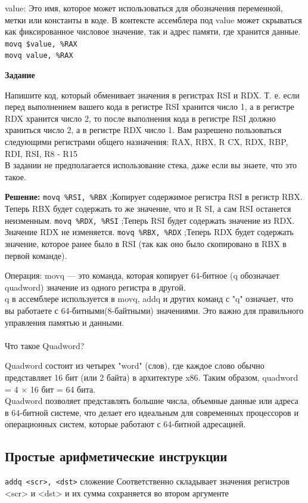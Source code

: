	\par value: Это имя, которое может использоваться для обозначения переменной, метки или константы в коде. В контексте ассемблера под value может скрываться как фиксированное числовое значение, так и адрес памяти, где хранится данные.
	\\
	\texttt{movq \$value, \%RAX}
 	\\
 	\texttt{movq value, \%RAX}

	
    \textbf{Задание}
	\par Напишите код, который обменивает значения в регистрах RSI и RDX. Т. е. если перед выполнением вашего кода в регистре RSI хранится число 1, а в регистре RDX хранится число 2, то после выполнения кода в регистре RSI должно храниться число 2, а в регистре RDX число 1. Вам разрешено пользоваться следующими регистрами общего назначения: RAX, RBX, R
	CX, RDX, RBP, RDI, RSI, R8 - R15
	\\В задании не предполагается использование стека, даже если вы знаете, что это такое.
	
	\textbf{Решение:}
	\texttt {movq \%RSI, \%RBX} ;Копирует содержимое регистра RSI в регистр RBX. Теперь RBX будет содержать то же значение, что и R
	SI, а сам RSI останется неизменным.
    \texttt{movq \%RDX, \%RSI} ;Теперь RSI будет содержать значение из RDX. Значение RDX не изменяется.
	\texttt{movq \%RBX, \%RDX} ;Теперь RDX будет содержать значение, которое ранее было в RSI (так как оно было скопировано в RBX
	в первой команде).
	
	Операция: movq — это команда, которая копирует 64-битное (q обозначает quadword) значение из одного регистра в другой. 
	\\q в ассемблере используется в movq, addq и других команд с "q" означает, что вы работаете с 64-битными(8-байтными) значениями. Это важно для правильного управления памятью и данными.
	\\
	\\Что такое Quadword?
	\par Quadword состоит из четырех "word" (слов), где каждое слово обычно представляет 16 бит (или 2 байта) в архитектуре
	x86. Таким образом, quadword = 4 × 16 бит = 64 бита.
	\\Quadword позволяет представлять большие числа, объемные данные или адреса в 64-битной системе, что делает его идеальным для современных процессоров и операционных систем, которые работают с 64-битной адресацией.
	
	\subsection{Простые арифметические инструкции}
	\texttt {addq <scr>, <dst>} сложение
	Соответственно складывает значения регистров <scr> и <dst> и их сумма сохраняется во втором аргументе
	
